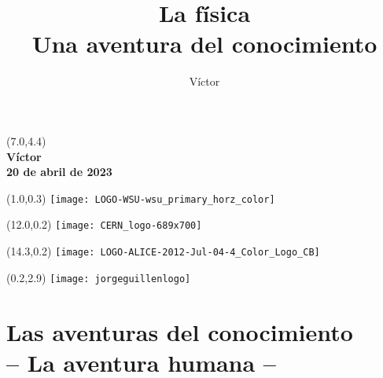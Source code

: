 \documentclass[14pt,aspectratio=169,t]{beamer}
\title{\LARGE \textbf{La física\\Una aventura del conocimiento}}
\author{Víctor}
\date{}
\begin{document}
\begin{frame}{}
  \begin{textblock}{8}(7.0,4.4)
  {}\\
  \vspace{0.1in}
  {\large \textbf{Víctor}}\\
  \vspace{0.2in}
  {\small\textbf{20 de abril de 2023}}
  \end{textblock}
  
  \begin{textblock}{12}(1.0,0.3)
      \texttt{[image: LOGO-WSU-wsu\_primary\_horz\_color]}
  \end{textblock}
  \begin{textblock}{10}(12.0,0.2)
      \texttt{[image: CERN\_logo-689x700]}
  \end{textblock}
  \begin{textblock}{10}(14.3,0.2)
      \texttt{[image: LOGO-ALICE-2012-Jul-04-4\_Color\_Logo\_CB]}
  \end{textblock}
  \begin{textblock}{10}(0.2,2.9)
      \texttt{[image: jorgeguillenlogo]}
  \end{textblock}
\end{frame}

\section{\LARGE \textbf{Las aventuras del conocimiento\\\vspace{.2in}-- La aventura humana --}}
\end{document}
